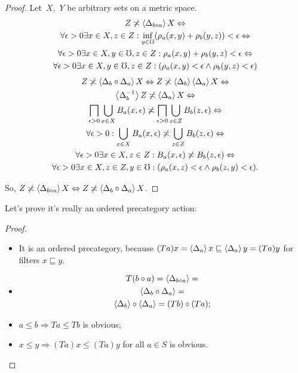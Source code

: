 \begin{proof}
Let~$X$,~$Y$ be arbitrary sets on a metric space.
\begin{multline*}
Z\not\asymp\left\langle \Delta_{b\circ a}\right\rangle X \Leftrightarrow \\
\forall\epsilon>0\exists x\in X,z\in Z:\inf_{y\in\mho}(\rho_a(x,y)+\rho_b(y,z))<\epsilon \Leftrightarrow \\
\forall\epsilon>0\exists x\in X,y\in\mho,z\in Z:\rho_a(x,y)+\rho_b(y,z)<\epsilon \Leftrightarrow \\
\forall\epsilon>0\exists x\in X,y\in\mho,z\in Z:(\rho_a(x,y)<\epsilon\land\rho_b(y,z)<\epsilon)
\end{multline*}
\begin{multline*}
Z\not\asymp\left\langle \Delta_b\circ\Delta_a\right\rangle X \Leftrightarrow
Z\not\asymp\left\langle \Delta_b\right\rangle\left\langle \Delta_a\right\rangle X\Leftrightarrow\\
\left\langle \Delta_b^{-1}\right\rangle Z\not\asymp\left\langle \Delta_a\right\rangle X \Leftrightarrow\\
\bigsqcap_{\epsilon>0}\bigcup_{x\in X}B_a(x,\epsilon) \not\asymp\bigsqcap_{\epsilon>0}\bigcup_{z\in Z}B_b(z,\epsilon) \Leftrightarrow \\
\forall\epsilon>0:\bigcup_{x\in X}B_a(x,\epsilon) \not\asymp\bigcup_{z\in Z}B_b(z,\epsilon) \Leftrightarrow \\
\forall\epsilon>0\exists x\in X,z\in Z:B_a(x,\epsilon)\not\asymp B_b(z,\epsilon) \Leftrightarrow \\
\forall\epsilon>0\exists x\in X,z\in Z,y\in\mho:(\rho_a(x,z)<\epsilon\land\rho_b(z,y)<\epsilon).
\end{multline*}

So, $Z\not\asymp\left\langle \Delta_{b\circ a}\right\rangle X \Leftrightarrow Z\not\asymp\left\langle \Delta_b\circ\Delta_a\right\rangle X$.
\end{proof}

Let's prove it's really an ordered precategory action:

\begin{proof}
~
\begin{itemize}
\item It is an ordered precategory, because
$(Ta)x = \left\langle \Delta_a\right\rangle x \sqsubseteq \left\langle \Delta_a\right\rangle y = (Ta)y$ 
for filters $x\sqsubseteq y$.

\item
\begin{multline*}
T(b\circ a) = \left\langle \Delta_{b\circ a}\right\rangle = \\ \left\langle \Delta_b\circ\Delta_a\right\rangle = \\ \left\langle \Delta_b\right\rangle\circ\left\langle \Delta_a\right\rangle = (Tb)\circ(Ta);
\end{multline*}
\item $a\leq b\Rightarrow Ta\leq Tb$ is obvious;
\item $x\leq y\Rightarrow(Ta)x\leq (Ta)y$ for all $a\in S$ is obvious.
\end{itemize}
\end{proof}

